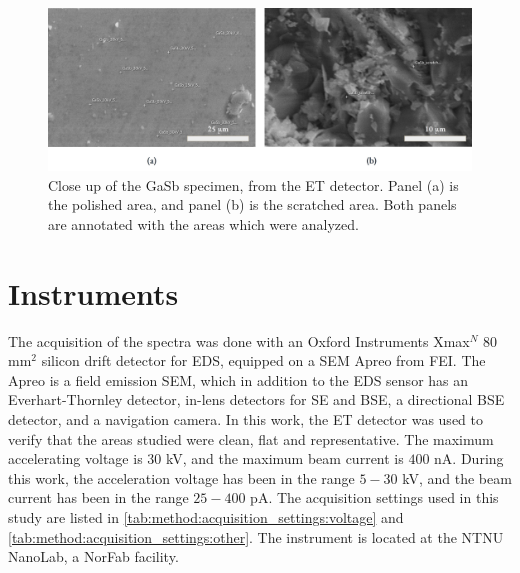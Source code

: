 \begin{figure}[htbp]
    \centering
    \includegraphics[width=.99\textwidth]{figures/SE_images/GaSb_close.jpg}
    \caption{
        Close up of the GaSb specimen, from the ET detector.
        Panel (a) is the polished area, and panel (b) is the scratched area.
        Both panels are annotated with the areas which were analyzed.
    }
    \label{fig:SE_images:GaSb}
\end{figure}


















\section{Instruments}
\label{method:instruments}

The acquisition of the spectra was done with an Oxford Instruments Xmax$^N$ $80$ mm$^2$ silicon drift detector for EDS, equipped on a SEM Apreo from FEI.
The Apreo is a field emission SEM, which in addition to the EDS sensor has an Everhart-Thornley detector, in-lens detectors for SE and BSE, a directional BSE detector, and a navigation camera.
In this work, the ET detector was used to verify that the areas studied were clean, flat and representative.
The maximum accelerating voltage is $30$ kV, and the maximum beam current is $400$ nA.
During this work, the acceleration voltage has been in the range $5-30$ kV, and the beam current has been in the range $25-400$ pA.
The acquisition settings used in this study are listed in \cref{tab:method:acquisition_settings:voltage} and \cref{tab:method:acquisition_settings:other}.
The instrument is located at the NTNU NanoLab, a NorFab facility.


